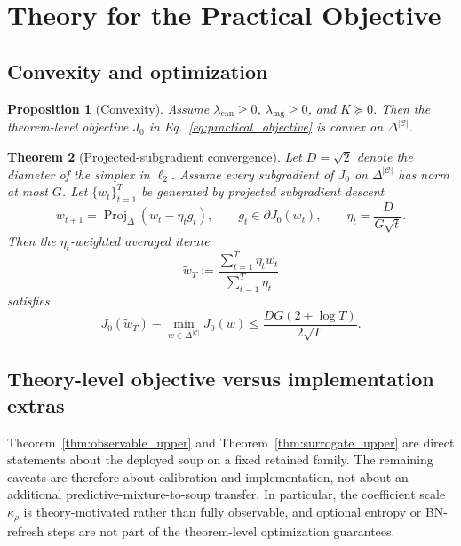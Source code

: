 \documentclass{article}
\newtheorem{theorem}{Theorem}[section]
\newtheorem{proposition}[theorem]{Proposition}
\theoremstyle{definition}
\newcommand{\cC}{\mathcal{C}}
\newcommand{\proj}{\operatorname{Proj}}
\newcommand{\simplex}{\Delta}
\newcommand{\paren}[1]{\left( #1 \right)}
\begin{document}
\section{Theory for the Practical Objective}
\label{sec:theory}

\subsection{Convexity and optimization}

\begin{proposition}[Convexity]
\label{prop:convexity}
Assume \(\lambda_{\mathrm{can}}\ge 0\), \(\lambda_{\mathrm{mg}}\ge 0\), and \(K\succeq 0\). Then the theorem-level objective \(J_0\) in Eq.~\eqref{eq:practical_objective} is convex on \(\simplex^{|\cC|}\).
\end{proposition}

\begin{theorem}[Projected-subgradient convergence]
\label{thm:convergence}
Let \(D=\sqrt{2}\) denote the diameter of the simplex in \(\ell_2\). Assume every subgradient of \(J_0\) on \(\simplex^{|\cC|}\) has norm at most \(G\). Let \(\{w_t\}_{t=1}^{T}\) be generated by projected subgradient descent
\[
w_{t+1}=\proj_{\simplex}\paren{w_t-\eta_t g_t},
\qquad
g_t \in \partial J_0(w_t),
\qquad
\eta_t=\frac{D}{G\sqrt{t}}.
\]
Then the \(\eta_t\)-weighted averaged iterate
\[
\tilde w_T
:=
\frac{\sum_{t=1}^{T}\eta_t w_t}{\sum_{t=1}^{T}\eta_t}
\]
satisfies
\begin{equation}
J_0(\tilde w_T)-\min_{w\in\simplex^{|\cC|}} J_0(w)
\le
\frac{DG(2+\log T)}{2\sqrt{T}}.
\label{eq:psg_rate}
\end{equation}
\end{theorem}

\subsection{Theory-level objective versus implementation extras}

Theorem~\ref{thm:observable_upper} and Theorem~\ref{thm:surrogate_upper} are direct statements about the deployed soup on a fixed retained family. The remaining caveats are therefore about calibration and implementation, not about an additional predictive-mixture-to-soup transfer. In particular, the coefficient scale \(\kappa_\rho\) is theory-motivated rather than fully observable, and optional entropy or BN-refresh steps are not part of the theorem-level optimization guarantees.
\end{document}
